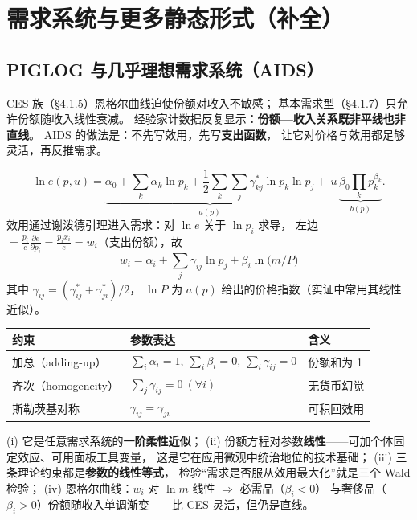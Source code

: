 \section{需求系统与更多静态形式（补全）}

\subsection{PIGLOG 与几乎理想需求系统（AIDS）}

CES 族（§4.1.5）恩格尔曲线迫使份额对收入不敏感；
基本需求型（§4.1.7）只允许份额随收入线性衰减。
经验家计数据反复显示：\textbf{份额—收入关系既非平线也非直线}。
AIDS 的做法是：不先写效用，先写\textbf{支出函数}，
让它对价格与效用都足够灵活，再反推需求。

\[
\ln e(p,u)=\underbrace{\alpha_0+\sum_k\alpha_k\ln p_k+\frac12\sum_k\sum_j\gamma_{kj}^{*}\ln p_k\ln p_j}_{a(p)}
+\ u\,\underbrace{\beta_0\prod_k p_k^{\beta_k}}_{b(p)}.
\]
效用通过谢泼德引理进入需求：对 $\ln e$ 关于 $\ln p_i$ 求导，
左边 $=\frac{p_i}{e}\frac{\partial e}{\partial p_i}=\frac{p_ix_i}{e}=w_i$（支出份额），故
\[
\boxed{\ w_i=\alpha_i+\sum_j\gamma_{ij}\ln p_j+\beta_i\ln\bigl(m/P\bigr)\ }
\]
其中 $\gamma_{ij}=(\gamma_{ij}^{*}+\gamma_{ji}^{*})/2$，
$\ln P$ 为 $a(p)$ 给出的价格指数（实证中常用其线性近似）。

\begin{center}
\small
\begin{tabular}{lll}
\toprule
约束 & 参数表达 & 含义 \\
\midrule
加总（adding-up） & $\sum_i\alpha_i=1,\ \sum_i\beta_i=0,\ \sum_i\gamma_{ij}=0$ & 份额和为 1 \\
齐次（homogeneity） & $\sum_j\gamma_{ij}=0\ (\forall i)$ & 无货币幻觉 \\
斯勒茨基对称 & $\gamma_{ij}=\gamma_{ji}$ & 可积回效用 \\
\bottomrule
\end{tabular}
\end{center}

(i) 它是任意需求系统的\textbf{一阶柔性近似}；
(ii) 份额方程对参数\textbf{线性}——可加个体固定效应、可用面板工具变量，
这是它在应用微观中统治地位的技术基础；
(iii) 三条理论约束都是\textbf{参数的线性等式}，
检验“需求是否服从效用最大化”就是三个 Wald 检验；
(iv) 恩格尔曲线：$w_i$ 对 $\ln m$ 线性 $\Rightarrow$ 必需品（$\beta_i<0$）
与奢侈品（$\beta_i>0$）份额随收入单调渐变——比 CES 灵活，但仍是直线。

